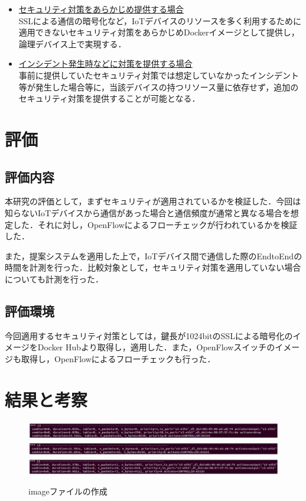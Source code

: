 \documentclass[Japanese]{dicomopapers}
\begin{document}
\begin{itemize}
	\item \underline{セキュリティ対策をあらかじめ提供する場合}\mbox{}\\
	      SSLによる通信の暗号化など，IoTデバイスのリソースを多く利用するために適用できないセキュリティ対策をあらかじめDockerイメージとして提供し，論理デバイス上で実現する．
	\item \underline{インシデント発生時などに対策を提供する場合}\mbox{}\\
	      事前に提供していたセキュリティ対策では想定していなかったインシデント等が発生した場合等に，当該デバイスの持つリソース量に依存せず，追加のセキュリティ対策を提供することが可能となる．
\end{itemize}

\section{評価}
\subsection{評価内容}
本研究の評価として，まずセキュリティが適用されているかを検証した．今回は知らないIoTデバイスから通信があった場合と通信頻度が通常と異なる場合を想定した．それに対し，OpenFlowによるフローチェックが行われているかを検証した．\par
また，提案システムを適用した上で，IoTデバイス間で通信した際のEndtoEndの時間を計測を行った．比較対象として，セキュリティ対策を適用していない場合についても計測を行った．

\subsection{評価環境}
今回適用するセキュリティ対策としては，鍵長が1024bitのSSLによる暗号化のイメージをDocker Hubより取得し，適用した．また，OpenFlowスイッチのイメージも取得し，OpenFlowによるフローチェックも行った．

\section{結果と考察}

\begin{figure}[!tb]
	\centering
	\includegraphics[width=\linewidth]{img/result_flow2v2.eps}
	\includegraphics[width=\linewidth]{img/result_flow3v2.eps}
	\includegraphics[width=\linewidth]{img/result_flow4v2.eps}
	\caption{imageファイルの作成}
	\label{fig:result1}
\end{figure}
\end{document}
